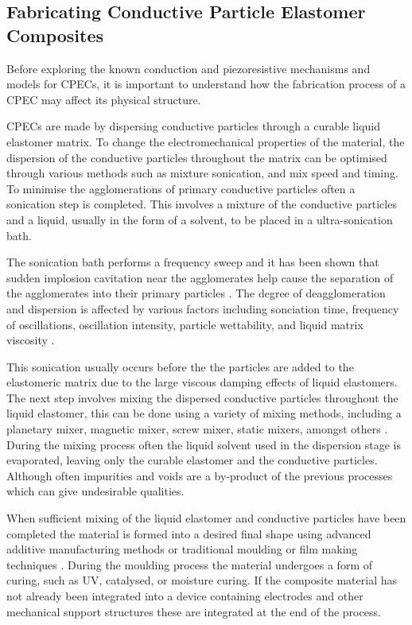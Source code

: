 \subsection{Fabricating Conductive Particle Elastomer Composites}
\label{subsec:Fabricating Conductive Particle Elastomer Composites}
Before exploring the known conduction and piezoresistive mechanisms and models for CPECs, it is important to understand how the fabrication process of a CPEC may affect its physical structure. 

CPECs are made by dispersing conductive particles through a curable liquid elastomer matrix. To change the electromechanical properties of the material, the dispersion of the conductive particles throughout the matrix can be optimised through various methods such as mixture sonication, and mix speed and timing. To minimise the agglomerations of primary conductive particles often a sonication step is completed. This involves a mixture of the conductive particles and a liquid, usually in the form of a solvent, to be placed in a ultra-sonication bath. 

The sonication bath performs a frequency sweep and it has been shown that sudden implosion cavitation near the agglomerates help cause the separation of the agglomerates into their primary particles \cite{Priyadarshi2021,Kudryashova2019}. The degree of deagglomeration and dispersion is affected by various factors including sonciation time, frequency of oscillations, oscillation intensity, particle wettability, and liquid matrix viscosity \cite{Kudryashova2019,Chen2020a}. 

This sonication usually occurs before the the particles are added to the elastomeric matrix due to the large viscous damping effects of liquid elastomers. The next step involves mixing the dispersed conductive particles throughout the liquid elastomer, this can be done using a variety of mixing methods, including a planetary mixer, magnetic mixer, screw mixer, static mixers, amongst others \cite{Pegel2008,Rosset2016,Fekiri2020,Kim2012}. During the mixing process often the liquid solvent used in the dispersion stage is evaporated, leaving only the curable elastomer and the conductive particles. Although often impurities and voids are a by-product of the previous processes which can give undesirable qualities.

When sufficient mixing of the liquid elastomer and conductive particles have been completed the material is formed into a desired final shape using advanced additive manufacturing methods \cite{Bastola2018,Sapra2023,Krueger2014,Li2020,McCoul2017,Yi2023,Kim2018a} or traditional moulding \cite{Kim2018} or film making techniques \cite{Fasolt2017}. During the moulding process the material undergoes a form of curing, such as UV, catalysed, or moisture curing. If the composite material has not already been integrated into a device containing electrodes and other mechanical support structures these are integrated at the end of the process.




